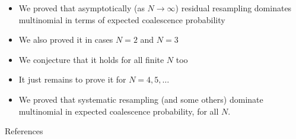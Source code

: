 \documentclass[aspectratio=169]{beamer}
\theoremstyle{definition}
\begin{document}
\begin{frame}
\begin{itemize}
\item We proved that asymptotically (as $N\to\infty$) residual resampling dominates multinomial in terms of expected coalescence probability
\item We also proved it in cases $N=2$ and $N=3$
\pause
\item We conjecture that it holds for all finite $N$ too
\item It just remains to prove it for $N=4,5,\dots$
\pause
\item We proved that systematic resampling (and some others) dominate multinomial in expected coalescence probability, for all $N$.
\end{itemize}
\end{frame}


\begin{frame}[allowframebreaks]{References}

{\small 
%
}
\end{frame}
\end{document}
